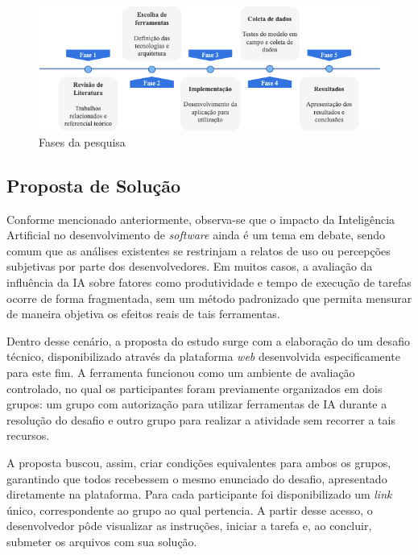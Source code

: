 \documentclass[english,brazilian]{UNISINOSartigo} %
\begin{document}
\begin{figure}[ht]
    \caption{Fases da pesquisa}
    \label{fig:fases_pesquisa}
    \centering%
    \footnotesize
	\begin{minipage}{.9\textwidth}
		\includegraphics[width=\textwidth]{images/fases_pesquisa.png}
	\end{minipage}
\end{figure}
\FloatBarrier

\subsection{Proposta de Solução}

Conforme mencionado anteriormente, observa-se que o impacto da Inteligência Artificial no desenvolvimento de \textit{software} ainda é um tema em debate, sendo comum que as análises existentes se restrinjam a relatos de uso ou percepções subjetivas por parte dos desenvolvedores. Em muitos casos, a avaliação da influência da IA sobre fatores como produtividade e tempo de execução de tarefas ocorre de forma fragmentada, sem um método padronizado que permita mensurar de maneira objetiva os efeitos reais de tais ferramentas.

Dentro desse cenário, a proposta do estudo surge com a elaboração do um desafio técnico, disponibilizado através da plataforma \textit{web} desenvolvida especificamente para este fim. A ferramenta funcionou como um ambiente de avaliação controlado, no qual os participantes foram previamente organizados em dois grupos: um grupo com autorização para utilizar ferramentas de IA durante a resolução do desafio e outro grupo para realizar a atividade sem recorrer a tais recursos.

A proposta buscou, assim, criar condições equivalentes para ambos os grupos, garantindo que todos recebessem o mesmo enunciado do desafio, apresentado diretamente na plataforma. Para cada participante foi disponibilizado um \textit{link} único, correspondente ao grupo ao qual pertencia. A partir desse acesso, o desenvolvedor pôde visualizar as instruções, iniciar a tarefa e, ao concluir, submeter os arquivos com sua solução.
\end{document}
